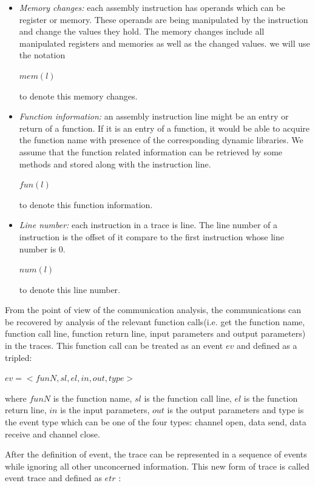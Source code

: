 \begin{itemize}
\item \textit{Memory changes:}  each assembly instruction has operands which can be register or memory. These operands are being manipulated by the instruction and change the values they hold. The memory changes include all manipulated registers and memories as well as the changed values. we will use the notation 

$mem(l)$ 

to denote this memory changes. 

\item \textit{Function information:} an assembly instruction line might be an entry or return of a function. If it is an entry of a function, it would be able to acquire the function name with presence of the corresponding dynamic libraries. We assume that the function related information can be retrieved by some methods and stored along with the instruction line.

$fun(l)$ 

to denote this function information. 

\item \textit{Line number:} each instruction in a trace is line. The line number of a instruction is the offset of it compare to the first instruction whose line number is 0.

$num(l)$ 

to denote this line number. 

\end{itemize}

From the point of view of the communication analysis, the communications can be recovered by analysis of the relevant function calls(i.e. get the function name, function call line, function return line, input parameters and output parameters) in the traces. This function call can be treated as an event $ev$ and defined as a tripled:

$ev = <funN, sl, el, in, out, type>$

where $funN$ is the function name, $sl$ is the function call line, $el$ is the function return line, $in$ is the input parameters, $out$ is the output parameters and type is the event type which can be one of the four types: channel open, data send, data receive and channel close.

After the definition of event, the trace can be represented in a sequence of events while ignoring all other unconcerned information. This new form of trace is called event trace and defined as $etr$ :

